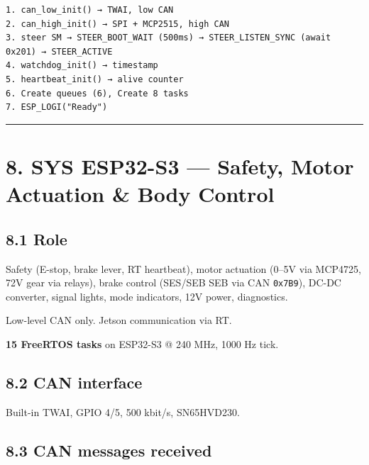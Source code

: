 \documentclass[12pt,a4paper,oneside]{report}
\begin{document}
\begin{verbatim}
1. can_low_init() → TWAI, low CAN
2. can_high_init() → SPI + MCP2515, high CAN
3. steer SM → STEER_BOOT_WAIT (500ms) → STEER_LISTEN_SYNC (await 0x201) → STEER_ACTIVE
4. watchdog_init() → timestamp
5. heartbeat_init() → alive counter
6. Create queues (6), Create 8 tasks
7. ESP_LOGI("Ready")
\end{verbatim}

\begin{center}\rule{0.5\linewidth}{0.5pt}\end{center}

\section{8. SYS ESP32-S3 --- Safety, Motor Actuation \& Body
Control}\label{sys-esp32-s3-safety-motor-actuation-body-control}

\subsection{8.1 Role}\label{role-1}

Safety (E-stop, brake lever, RT heartbeat), motor actuation (0--5V via MCP4725,
72V gear via relays), brake control (SES/SEB SEB via CAN \texttt{0x7B9}), DC-DC
converter, signal lights, mode indicators, 12V power, diagnostics.

Low-level CAN only. Jetson communication via RT.

\textbf{15 FreeRTOS tasks} on ESP32-S3 @ 240 MHz, 1000 Hz tick.

\subsection{8.2 CAN interface}\label{can-interface}

Built-in TWAI, GPIO 4/5, 500 kbit/s, SN65HVD230.

\subsection{8.3 CAN messages received}\label{can-messages-received-1}
\end{document}
